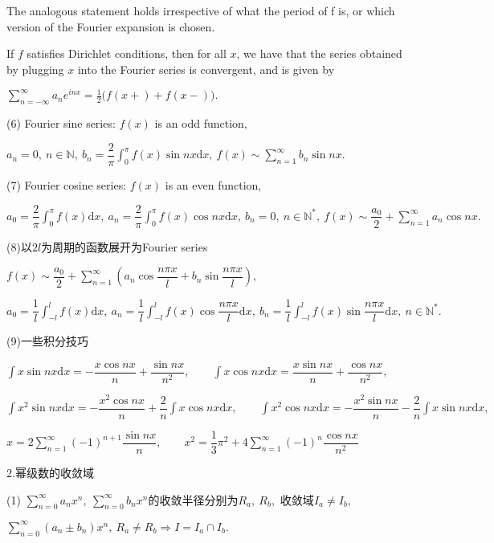 \documentclass[UTF8]{ctexart}
\newcommand\dif{\mathrm{d}}
\newcommand\no{\noindent}
\newcommand\dis{\displaystyle}
\newcommand\sumn{\dis\sum\limits_{n=1}^{\infty}}
\newcommand\sumnz{\dis\sum\limits_{n=0}^{\infty}}
\newcommand\intd{\dis\int}
\begin{document}
\begin{spacing}{2}
The analogous statement holds irrespective of what the period of f is, or which version of the Fourier expansion is chosen. 

If $f$ satisfies Dirichlet conditions, then for all $x$, we have that the series obtained by plugging $x$ into the Fourier series is convergent, and is given by

\centerline{\textcolor[rgb]{0,0,1}{${\displaystyle \sum _{n=-\infty }^{\infty }a_{n}e^{inx}={\frac {1}{2}}\big(f(x+)+f(x-)\big)}.$}}

\no(6) Fourier sine series: $f(x)$ is an odd function,

$a_n=0,\ n\in\mathbb{N},\ b_n=\dfrac{2}{\pi}\intd_0^\pi f(x)\sin nx\dif x,\ 
f(x)\sim\sumn b_n\sin nx.$

\no(7) Fourier cosine series: $f(x)$ is an even function,

$a_0=\dfrac{2}{\pi}\intd_0^\pi f(x)\dif x,\ a_n=\dfrac{2}{\pi}\intd_0^\pi f(x)\cos nx\dif x,\ 
b_n=0,\ n\in\mathbb{N}^*,\ f(x)\sim\dfrac{a_0}{2}+\sumn a_n\cos nx.$

\no(8)以$2l$为周期的函数展开为Fourier series

$f(x)\sim\dfrac{a_0}{2}+\sumn\left(a_n\cos\dfrac{n\pi x}{l}+b_n\sin\dfrac{n\pi x}{l}\right),$

$ a_0=\dfrac{1}{l}\intd_{-l}^lf(x)\dif x,\ a_n=\dfrac{1}{l}\intd_{-l}^lf(x)\cos\dfrac{n\pi x}{l}\dif x,\ b_n=\dfrac{1}{l}\intd_{-l}^lf(x)\sin\dfrac{n\pi x}{l}\dif x,\ n\in\mathbb{N}^*.$

\no(9)一些积分技巧

$\intd x\sin nx\dif x=-\dfrac{x\cos nx}{n}+\dfrac{\sin nx}{n^2},
\qquad
\intd x\cos nx\dif x=\dfrac{x\sin nx}{n}+\dfrac{\cos nx}{n^2},$

\vspace{0.2cm}

$\intd x^2\sin nx\dif x=-\dfrac{x^2\cos nx}{n}+\dfrac{2}{n}\intd x\cos nx\dif x,
\qquad
\intd x^2\cos nx\dif x=-\dfrac{x^2\sin nx}{n}-\dfrac{2}{n}\intd x\sin nx\dif x,$

\vspace{0.2cm}

$x=2\sumn(-1)^{n+1}\dfrac{\sin nx}{n},
\qquad
x^2=\dfrac{1}{3}\pi^2+4\sumn(-1)^n\dfrac{\cos nx}{n^2}$

\no2.幂级数的收敛域

(1) $\sumnz a_nx^n,\ \sumnz b_nx^n$的收敛半径分别为$R_a,\ R_b,$ 收敛域$I_a\neq I_b,$

\centerline{$\sumnz (a_n\pm b_n)x^n,\ R_a\neq R_b\Longrightarrow I=I_a\cap I_b.$}


\end{spacing}
\end{document}
